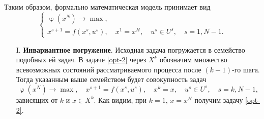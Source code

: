 \documentclass[a4paper, 12pt]{report}
\numberwithin{equation}{section}
\renewcommand{\varphi}{\upvarphi}
\begin{document}
    \\\\
Таким образом, формально математическая модель принимает вид
\begin{equation}
\begin{cases}
\label{opt-2}
    \varphi(x^N) \to \max, \\
    x^{s+1} = f(x^s, u^s),\quad x^1 = x^H,\quad u^s \in U^s,\quad s=\overline{1, N-1}.
\end{cases}
\end{equation}
\begin{enumerate}
    \item[I.] \textbf{Инвариантное погружение}. Исходная задача погружается в семейство подобных ей задач. 
В задаче \eqref{opt-2} через $X^k$ обозначим множество всевозможных состояний рассматриваемого процесса после $(k-1)$-го шага. Тогда указанным выше семейством будет совокупность задач
\begin{equation}
\label{opt-3}
\varphi(x^N) \to \max, \quad x^{s+1} = f(x^s, u^s),\quad x^k = x, \quad u^s \in U^s,\quad s=k, N-1,
\end{equation}
зависящих от $k$ и $x \in X^k$.
Как видим, при $k=1$, $x = x^H$ получим задачу \eqref{opt-2}.


\end{enumerate}
\end{document}
